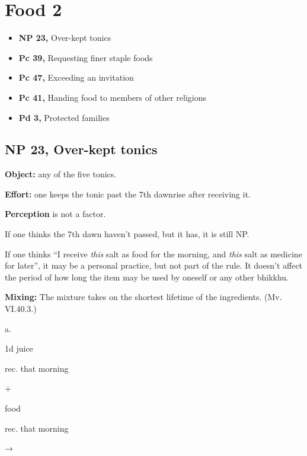 \chapter{Food 2}

\begin{itemize}
\tightlist
\item
  \textbf{NP 23,} Over-kept tonics
\item
  \textbf{Pc 39,} Requesting finer staple foods
\item
  \textbf{Pc 47,} Exceeding an invitation
\item
  \textbf{Pc 41,} Handing food to members of other religions
\item
  \textbf{Pd 3,} Protected families
\end{itemize}

\section{NP 23, Over-kept tonics}


\begin{multicols}{2}

\textbf{Object:} any of the five tonics.

\textbf{Effort:} one keeps the tonic past the 7th dawnrise after
receiving it.

\textbf{Perception} is not a factor.

If one thinks the 7th dawn haven't passed, but it has, it is still NP.

If one thinks ``I receive \emph{this} salt as food for the morning, and
\emph{this} salt as medicine for later'', it may be a personal practice,
but not part of the rule. It doesn't affect the period of how long the
item may be used by oneself or any other bhikkhu.

\end{multicols}

\enlargethispage{2\baselineskip}

\textbf{Mixing:} The mixture takes on the shortest lifetime of the
ingredients. (Mv. VI.40.3.)

a.

1d juice

rec. that morning

+

food

rec. that morning

→

